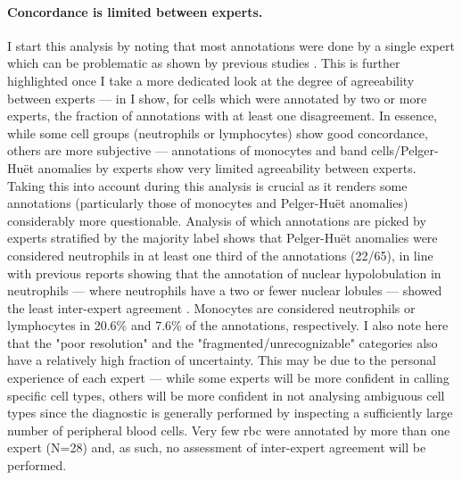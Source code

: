 \begin{figure}[!ht]
    \label{fig:tbca}
\end{figure}

\paragraph{Concordance is limited between experts.} I start this analysis by noting that most annotations were done by a single expert which can be problematic as shown by previous studies \cite{De_Swart2017-wc,Howe2004-mn,Goasguen2009-dn,Foucar2020-uz}. This is further highlighted once I take a more dedicated look at the degree of agreeability between experts --- in  I show, for cells which were annotated by two or more experts, the fraction of annotations with at least one disagreement. In essence, while some cell groups (neutrophils or lymphocytes) show good concordance, others are more subjective --- annotations of monocytes and band cells/Pelger-Huët anomalies by experts show very limited agreeability between experts. Taking this into account during this analysis is crucial as it renders some annotations (particularly those of monocytes and Pelger-Huët anomalies) considerably more questionable. Analysis of which annotations are picked by experts stratified by the majority label shows that Pelger-Huët anomalies were considered neutrophils in at least one third of the annotations (22/65), in line with previous reports showing that the annotation of nuclear hypolobulation in neutrophils --- where neutrophils have a two or fewer nuclear lobules --- showed the least inter-expert agreement \cite{Weinberg2015-ra}. Monocytes are considered neutrophils or lymphocytes in 20.6\% and 7.6\% of the annotations, respectively. I also note here that the "poor resolution" and the "fragmented/unrecognizable" categories also have a relatively high fraction of uncertainty. This may be due to the personal experience of each expert --- while some experts will be more confident in calling specific cell types, others will be more confident in not analysing ambiguous cell types since the diagnostic is generally performed by inspecting a sufficiently large number of peripheral blood cells. Very few \ac{rbc} were annotated by more than one expert (N=28) and, as such, no assessment of inter-expert agreement will be performed.


